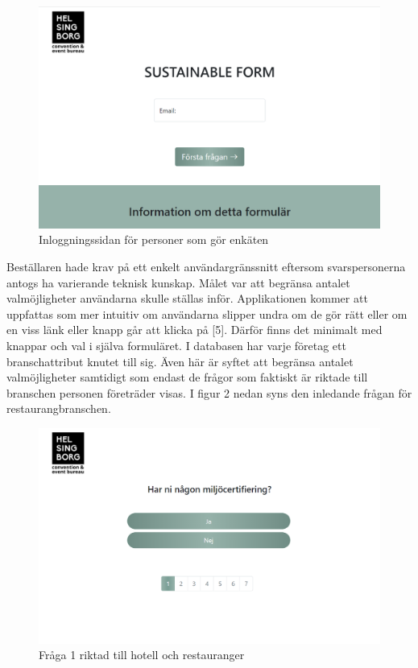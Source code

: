 \documentclass[12pt]{article}
\begin{document}
\begin{figure}[H]
    \centering
    \includegraphics[width=12cm]{images/log_in_page.png}
    \caption{Inloggningssidan för personer som gör enkäten}
    \label{fig:my_label}
\end{figure}

Beställaren hade krav på ett enkelt användargränssnitt eftersom svarspersonerna antogs ha varierande teknisk kunskap. Målet var att begränsa antalet valmöjligheter användarna skulle ställas inför. Applikationen kommer att uppfattas som mer intuitiv om användarna slipper undra om de gör rätt eller om en viss länk eller knapp går att klicka på [5]. Därför finns det minimalt med knappar och val i själva formuläret. I databasen har varje företag ett branschattribut knutet till sig. Även här är syftet att begränsa antalet valmöjligheter samtidigt som endast de frågor som faktiskt är riktade till branschen personen företräder visas. I figur 2 nedan syns den inledande frågan för restaurangbranschen.


\begin{figure}[H]
    \centering
    \includegraphics[width=12cm]{images/question_page.png}
    \caption{Fråga 1 riktad till hotell och restauranger}
    \label{fig:question}
\end{figure}
\end{document}
